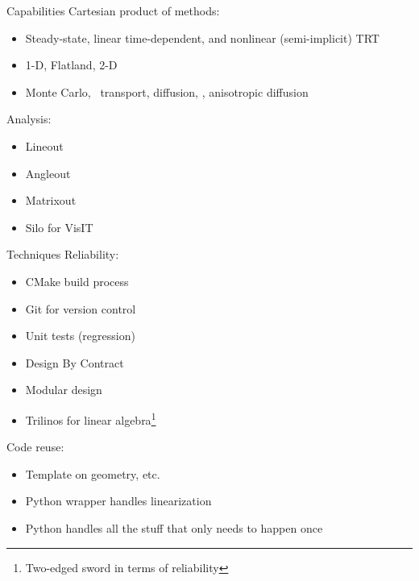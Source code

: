 \documentclass{beamer}
\begin{document}
\begin{frame}{Capabilities}
Cartesian product of methods:
\begin{itemize}
  \item Steady-state, linear time-dependent, and nonlinear (semi-implicit)
    TRT
  \item 1-D, Flatland, 2-D
  \item Monte Carlo, \SN\ transport, diffusion, \Pone, anisotropic diffusion
\end{itemize}

Analysis:
\begin{itemize}
  \item Lineout
  \item Angleout
  \item Matrixout
  \item Silo for VisIT
\end{itemize}
  
\end{frame}

\begin{frame}{Techniques}
Reliability:
\begin{itemize}
  \item CMake build process
  \item Git for version control
  \item Unit tests (regression)
  \item Design By Contract
  \item Modular design
  \item Trilinos for linear algebra\footnote{Two-edged sword in terms of
    reliability}
\end{itemize}

Code reuse:
\begin{itemize}
  \item Template on geometry, etc.
  \item Python wrapper handles linearization
  \item Python handles all the stuff that only needs to happen once
\end{itemize}
  
\end{frame}
\end{document}
